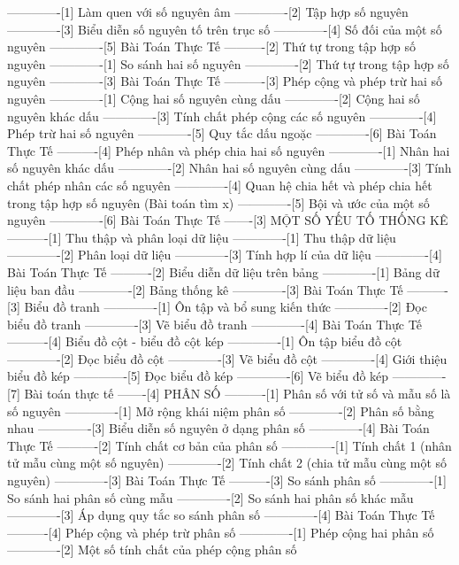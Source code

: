 -------------[1] Làm quen với số nguyên âm
-------------[2] Tập hợp số nguyên
-------------[3] Biểu diễn số nguyên tố trên trục số
-------------[4] Số đối của một số nguyên
-------------[5] Bài Toán Thực Tế
----------[2] Thứ tự trong tập hợp số nguyên
-------------[1] So sánh hai số nguyên
-------------[2] Thứ tự trong tập hợp số nguyên
-------------[3] Bài Toán Thực Tế
----------[3] Phép cộng và phép trừ hai số nguyên
-------------[1] Cộng hai số nguyên cùng dấu
-------------[2] Cộng hai số nguyên khác dấu
-------------[3] Tính chất phép cộng các số nguyên
-------------[4] Phép trừ hai số nguyên
-------------[5] Quy tắc dấu ngoặc
-------------[6] Bài Toán Thực Tế
----------[4] Phép nhân và phép chia hai số nguyên
-------------[1] Nhân hai số nguyên khác dấu
-------------[2] Nhân hai số nguyên cùng dấu
-------------[3] Tính chất phép nhân các số nguyên
-------------[4] Quan hệ chia hết và phép chia hết trong tập hợp số nguyên (Bài toán tìm x)
-------------[5] Bội và ước của một số nguyên
-------------[6] Bài Toán Thực Tế
-------[3] MỘT SỐ YẾU TỐ THỐNG KÊ
----------[1] Thu thập và phân loại dữ liệu
-------------[1] Thu thập dữ liệu
-------------[2] Phân loại dữ liệu
-------------[3] Tính hợp lí của dữ liệu
-------------[4] Bài Toán Thực Tế
----------[2] Biểu diễn dữ liệu trên bảng
-------------[1] Bảng dữ liệu ban đầu
-------------[2] Bảng thống kê
-------------[3] Bài Toán Thực Tế
----------[3] Biểu đồ tranh
-------------[1] Ôn tập và bổ sung kiến thức
-------------[2] Đọc biểu đồ tranh
-------------[3] Vẽ biểu đồ tranh
-------------[4] Bài Toán Thực Tế
----------[4] Biểu đồ cột - biểu đồ cột kép
-------------[1] Ôn tập biểu đồ cột
-------------[2] Đọc biểu đồ cột
-------------[3] Vẽ biểu đồ cột
-------------[4] Giới thiệu biểu đồ kép
-------------[5] Đọc biểu đồ kép
-------------[6] Vẽ biểu đồ kép
-------------[7] Bài toán thực tế
-------[4] PHÂN SỐ
----------[1] Phân số với tử số và mẫu số là số nguyên
-------------[1] Mở rộng khái niệm phân số
-------------[2] Phân số bằng nhau
-------------[3] Biểu diễn số nguyên ở dạng phân số
-------------[4] Bài Toán Thực Tế
----------[2] Tính chất cơ bản của phân số
-------------[1] Tính chất 1 (nhân tử mẫu cùng một số nguyên)
-------------[2] Tính chất 2 (chia tử mẫu cùng một số nguyên)
-------------[3] Bài Toán Thực Tế
----------[3] So sánh phân số
-------------[1] So sánh hai phân số cùng mẫu
-------------[2] So sánh hai phân số khác mẫu
-------------[3] Áp dụng quy tắc so sánh phân số
-------------[4] Bài Toán Thực Tế
----------[4] Phép cộng và phép trừ phân số
-------------[1] Phép cộng hai phân số
-------------[2] Một số tính chất của phép cộng phân số
